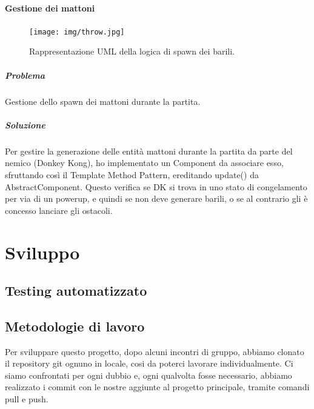 \subsubsection{Gestione dei mattoni}

\begin{figure}[H]
\centering{}
\texttt{[image: img/throw.jpg]}
\caption{Rappresentazione UML della logica di spawn dei barili.}
\end{figure}

\paragraph{Problema} Gestione dello spawn dei mattoni durante la partita.

\paragraph{Soluzione} Per gestire la generazione delle entità mattoni durante la partita da parte del nemico (Donkey Kong), ho implementato un Component da associare esso, sfruttando così il Template Method Pattern, ereditando update() da AbstractComponent. Questo verifica se DK si trova in uno stato di congelamento per via di un powerup, e quindi se non deve generare barili, o se al contrario gli è concesso lanciare gli ostacoli.

\chapter{Sviluppo}
\section{Testing automatizzato}

\section{Metodologie di lavoro}
Per sviluppare questo progetto, dopo alcuni incontri di gruppo, abbiamo clonato il repository git ognuno in locale, cosi da poterci lavorare individualmente.
Ci siamo confrontati per ogni dubbio e, ogni qualvolta fosse necessario, abbiamo realizzato i commit con le nostre aggiunte al progetto principale, tramite comandi pull e push.

